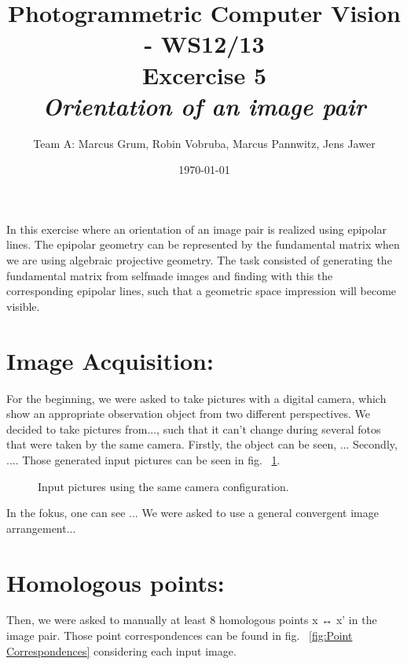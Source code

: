 \documentclass[a4paper,headings=small]{scrartcl}
\title{Photogrammetric Computer Vision - WS12/13 \\ Excercise 5 \\ \emph{Orientation of an image pair}}
\author{Team A: Marcus Grum, Robin Vobruba, Marcus Pannwitz, Jens Jawer}
\date{\today}
\numberwithin{equation}{section} %
\numberwithin{figure}{section}   %
\newcommand{\generatedImgRootImg}{../resources/img}
\begin{document}
\maketitle

In this exercise where an orientation of an image pair is realized using epipolar lines.
The epipolar geometry can be represented by the fundamental matrix
when we are using algebraic projective geometry. 
The task consisted of generating the fundamental matrix from selfmade images 
and finding with this the corresponding epipolar lines, 
such that a geometric space impression will become visible.

\section{Image Acquisition:}

For the beginning, we were asked to take pictures with a digital camera,
which show an appropriate observation object from two different perspectives.
We decided to take pictures from..., such that it can't change
during several fotos that were taken by the same camera.
Firstly, the object can be seen, ...
Secondly, ....
Those generated input pictures can be seen in fig. ~\ref{fig:Input pictures}.

\begin{figure}
   \hfill
  \caption{Input pictures using the same camera configuration.}
  \label{fig:Input pictures}
\end{figure}
  
In the fokus, one can see ...
We were asked to use a general convergent image arrangement...
 
\section{Homologous points:}

Then, we were asked to manually at least 8 homologous points x ↔ x' in the image pair.
Those point correspondences can be found in fig. ~\ref{fig:Point Correspondences}
considering each input image.
\end{document}
